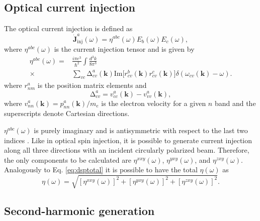 \documentclass[pss]{wiley2sp} %
\begin{document}
\subsection{Optical current injection}\label{sec:theory-OCI}

The optical current injection is defined as
\begin{equation*}
\mathbf{\dot{J}}^{a}_{\text{inj}}(\omega) =
\eta^{abc}(\omega)E_{b}(\omega)E_{c}(\omega), \label{eq:eta}
\end{equation*}
where $\eta^{abc}(\omega)$ is the current injection tensor and is given by
\begin{align*}
\eta^{abc}(\omega) =& \frac{i\pi e^{3}}{\hbar^{2}}\int\frac{d^{3}k}{8\pi^{3}}
\nonumber \\
\times &
\sum_{vc}\mathrm{\Delta}^{a}_{cv}(\mathbf{k})\text{Im}\big[r^{b}_{cv}(\mathbf{k})
r^{c}_{cv}(\mathbf{k})\big]\delta(\omega_{cv}(\mathbf{k})-\omega).
\end{align*}
where $r^{a}_{nm}$ is the position matrix elements and 
\begin{equation*}
\mathrm{\Delta}^{a}_{cv} = v^{a}_{cc}(\mathbf{k})-v^{a}_{vv}(\mathbf{k}),
\end{equation*}
where $v^{a}_{nn}(\mathbf{k})=p^{a}_{nn}(\mathbf{k})/m_{e}$ is the electron
velocity for a given $n$ band and the superscripts denote Cartesian
directions.

$\eta^{abc}(\omega)$ is purely imaginary and is antisymmetric with respect to
the last two indices \cite{arzatePRB14,sipePRB00,nastosPRB10}. Like in optical spin
injection, it is possible to generate current injection along all three
directions with an incident circularly polarized beam. Therefore, the only
components to be calculated are $\eta^{xxy}(\omega)$, $\eta^{yxy}(\omega)$,
and $\eta^{zxy}(\omega)$. Analogously to Eq.
\eqref{eq:dsptotal} it is possible to have the total $\eta(\omega)$ \cite{arzatePRB14} as
\begin{equation}\label{eq:etatotal}
\eta(\omega) =
\sqrt{[\eta^{xxy}(\omega)]^{2} +
      [\eta^{yxy}(\omega)]^{2} +
      [\eta^{zxy}(\omega)]^{2}
      }.
\end{equation}


\subsection{Second-harmonic generation}\label{sec:theory-SHG}
\end{document}
